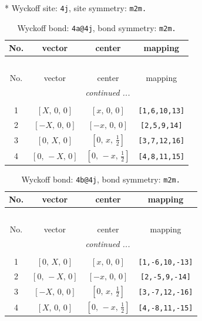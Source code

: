 \documentclass[fleqn,8pt]{jsarticle}
\begin{document}
* Wyckoff site: {\tt 4j}, site symmetry: {\tt m2m.}
\renewcommand{\arraystretch}{1.2}
\begin{longtable}{cccc}
\caption{Wyckoff bond: {\tt 4a@4j}, bond symmetry: {\tt m2m.}}
 \\
 \hline \hline
No. & vector & center & mapping \\ \hline \endfirsthead

\multicolumn{3}{l}{\tablename\ \thetable{}} \\
 \hline \hline
No. & vector & center & mapping \\ \hline \endhead

 \hline \hline
\multicolumn{3}{r}{\footnotesize\it continued ...} \\ \endfoot

 \hline \hline
\multicolumn{3}{r}{} \\ \endlastfoot

1 & $\left[ X,\, 0,\, 0 \right]$ & $\left[ x,\, 0,\, 0 \right]$ & {\tt [1,6,10,13]} \\ \hline
2 & $\left[ - X,\, 0,\, 0 \right]$ & $\left[ - x,\, 0,\, 0 \right]$ & {\tt [2,5,9,14]} \\ \hline
3 & $\left[ 0,\, X,\, 0 \right]$ & $\left[ 0,\, x,\, \frac{1}{2} \right]$ & {\tt [3,7,12,16]} \\ \hline
4 & $\left[ 0,\, - X,\, 0 \right]$ & $\left[ 0,\, - x,\, \frac{1}{2} \right]$ & {\tt [4,8,11,15]} \\
\end{longtable}
\renewcommand{\arraystretch}{1.2}
\begin{longtable}{cccc}
\caption{Wyckoff bond: {\tt 4b@4j}, bond symmetry: {\tt m2m.}}
 \\
 \hline \hline
No. & vector & center & mapping \\ \hline \endfirsthead

\multicolumn{3}{l}{\tablename\ \thetable{}} \\
 \hline \hline
No. & vector & center & mapping \\ \hline \endhead

 \hline \hline
\multicolumn{3}{r}{\footnotesize\it continued ...} \\ \endfoot

 \hline \hline
\multicolumn{3}{r}{} \\ \endlastfoot

1 & $\left[ 0,\, X,\, 0 \right]$ & $\left[ x,\, 0,\, 0 \right]$ & {\tt [1,-6,10,-13]} \\ \hline
2 & $\left[ 0,\, - X,\, 0 \right]$ & $\left[ - x,\, 0,\, 0 \right]$ & {\tt [2,-5,9,-14]} \\ \hline
3 & $\left[ - X,\, 0,\, 0 \right]$ & $\left[ 0,\, x,\, \frac{1}{2} \right]$ & {\tt [3,-7,12,-16]} \\ \hline
4 & $\left[ X,\, 0,\, 0 \right]$ & $\left[ 0,\, - x,\, \frac{1}{2} \right]$ & {\tt [4,-8,11,-15]} \\
\end{longtable}
\end{document}
